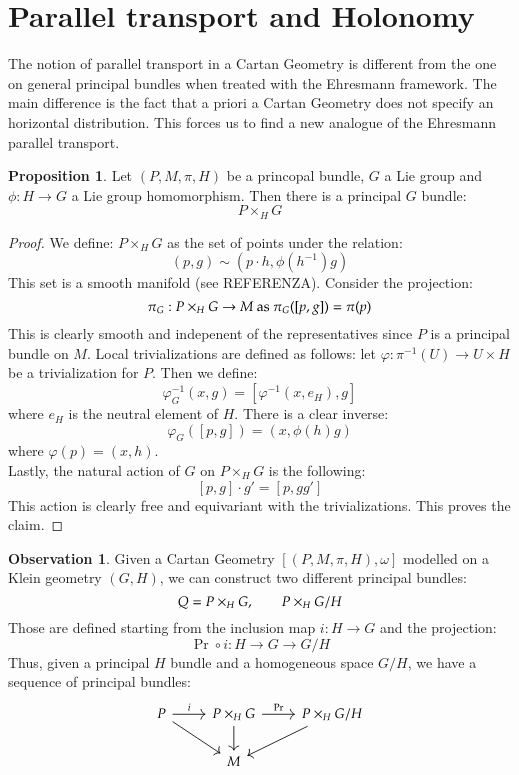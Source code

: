 \documentclass[12pt,a4paper]{report}
\theoremstyle{definition}
\theoremstyle{Theorem}
\newtheorem{Prop}[Def]{Proposition}
\theoremstyle{break}
\theoremstyle{definition}
\newtheorem{Obs}[Def]{Observation}
\begin{document}
	\section{Parallel transport and Holonomy}
	The notion of parallel transport in a Cartan Geometry is different from the one on general principal bundles when treated with the Ehresmann framework. The main difference is the fact that a priori a Cartan Geometry does not specify an horizontal distribution. This forces us to find a new analogue of the Ehresmann parallel transport.
	\begin{Prop}
		Let $(P,M,\pi,H)$ be a princopal bundle, $G$ a Lie group and $\phi: H\rightarrow G$ a Lie group homomorphism. Then there is a principal $G$ bundle:
		$$P\times_H G$$
	\end{Prop}
	\begin{proof}
		We define: $P\times_H G$ as the set of points under the relation:
		$$(p,g)\sim(p\cdot h,\phi(h^{-1})g)$$
		This set is a smooth manifold (see REFERENZA). Consider the projection:
		$$\pi_G: P\times_H G\rightarrow M\hbox{ as }\pi_G([p,g])=\pi(p)$$
		This is clearly smooth and indepenent of the representatives since $P$ is a principal bundle on $M$. Local trivializations are defined as follows: let $\varphi:\pi^{-1}(U)\rightarrow U\times H$ be a trivialization for $P$. Then we define:
		$$\varphi_G^{-1}(x,g)=[\varphi^{-1}(x,e_H),g]$$
		where $e_H$ is the neutral element of $H$. There is a clear inverse: 
		$$\varphi_G([p,g])=(x,\phi(h)g)$$
		where $\varphi(p)=(x,h)$.\\
		Lastly, the natural action of $G$ on $P\times_H G$ is the following:
		$$[p,g]\cdot g'=[p,gg']$$
		This action is clearly free and equivariant with the trivializations. This proves the claim.
	\end{proof}
	\begin{Obs}
		Given a Cartan Geometry $[(P,M,\pi,H),\omega]$ modelled on a Klein geometry $(G,H)$, we can construct two different principal bundles:
		$$Q=P\times_H G, \hspace{20 pt}P\times_H G/H$$
		Those are defined starting from the inclusion map $i:H\rightarrow G$ and the projection:
		$$\Pr\circ i:H\rightarrow G\rightarrow G/H$$
		Thus, given a principal $H$ bundle and a homogeneous space $G/H$, we have a sequence of principal bundles:
		$$\begin{tikzcd}
			P \arrow{dr}\arrow{r}{i}& P\times_H \arrow{d} G\arrow{r}{\Pr} &P\times_H G/H \arrow{dl} \\
			& M &
		\end{tikzcd}$$
	\end{Obs}
\end{document}
